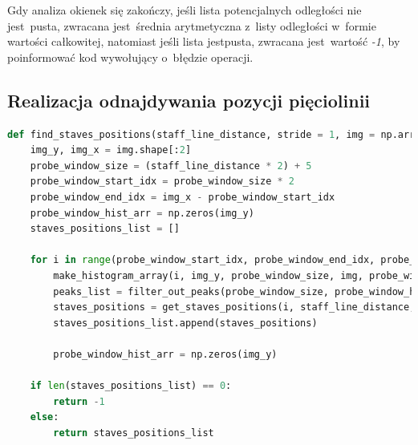 Gdy analiza okienek się zakończy, jeśli lista potencjalnych odległości nie jest~pusta, zwracana jest~średnia arytmetyczna z~listy odległości w~formie wartości całkowitej, natomiast jeśli lista jest\linebreak pusta, zwracana jest~wartość \textit{-1}, by poinformować kod wywołujący o~błędzie operacji.



\subsection{Realizacja odnajdywania pozycji pięciolinii}

\begin{lstlisting}[caption={\pyth|find_staves_positions()| - funkcja odnajdywania pozycji pięciolinii.}, label={find-staves-positions}, language=Python]
def find_staves_positions(staff_line_distance, stride = 1, img = np.array):
	img_y, img_x = img.shape[:2]
	probe_window_size = (staff_line_distance * 2) + 5
	probe_window_start_idx = probe_window_size * 2
	probe_window_end_idx = img_x - probe_window_start_idx
	probe_window_hist_arr = np.zeros(img_y)
	staves_positions_list = []
	
	for i in range(probe_window_start_idx, probe_window_end_idx, probe_window_size * stride):
		make_histogram_array(i, img_y, probe_window_size, img, probe_window_hist_arr)
		peaks_list = filter_out_peaks(probe_window_size, probe_window_hist_arr)
		staves_positions = get_staves_positions(i, staff_line_distance, peaks_list)
		staves_positions_list.append(staves_positions)
		
		probe_window_hist_arr = np.zeros(img_y)
	
	if len(staves_positions_list) == 0:
		return -1
	else:
		return staves_positions_list
\end{lstlisting}


